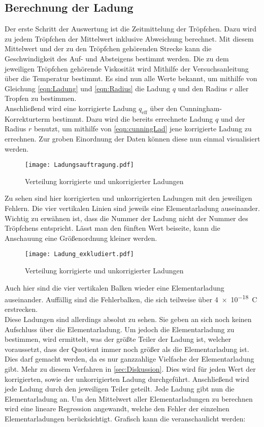 \subsection{Berechnung der Ladung}
Der erste Schritt der Auswertung ist die Zeitmittelung der Tröpfchen. Dazu wird zu jedem Tröpfchen der Mittelwert inklusive Abweichung berechnet. Mit diesem Mittelwert und der 
zu den Tröpfchen gehörenden Strecke kann die Geschwindigkeit des Auf- und Absteigens bestimmt werden.
Die zu dem jeweiligen Tröpfchen gehörende Viskosität wird Mithilfe der Versuchsanleitung über die Temperatur bestimmt. 
Es sind nun alle Werte bekannt, um mithilfe von Gleichung \eqref{eqn:Ladung} und \eqref{eqn:Radius} die Ladung $q$ und den Radius $r$ aller Tropfen zu 
bestimmen. \\
\noindent Anschließend wird eine korrigierte Ladung $q_\text{eff}$ über den Cunningham-Korrekturterm bestimmt. 
Dazu wird die bereits errechnete Ladung $q$ und der Radius $r$ benutzt, um mithilfe von \eqref{eqn:cunningLad} jene korrigierte Ladung zu errechnen.
Zur groben Einordnung der Daten können diese nun einmal visualisiert werden.

\begin{figure}
    \centering
    \texttt{[image: Ladungsauftragung.pdf]}
    \caption{Verteilung korrigierte und unkorrigierter Ladungen}
    \label{fig:Ladungsverteilung}
\end{figure}

\noindent Zu sehen sind hier korrigierten und unkorrigierten Ladungen mit den jeweiligen Fehlern. Die vier vertikalen Linien sind jeweils eine 
Elementarladung auseinander. Wichtig zu erwähnen ist, dass die Nummer der Ladung nicht der Nummer des Tröpfchens entspricht.
Lässt man den fünften Wert beiseite, kann die Anschauung eine Größenordnung kleiner werden. 

\begin{figure*}
    \centering
    \texttt{[image: Ladung\_exkludiert.pdf]}
    \caption{Verteilung korrigierte und unkorrigierter Ladungen}
\end{figure*}

\noindent Auch hier sind die vier vertikalen Balken wieder eine Elementarladung auseinander.
Auffällig sind die Fehlerbalken, die sich teilweise über \qty{4e-18}{\coulomb} erstrecken. \\
\noindent Diese Ladungen sind allerdings absolut zu sehen. Sie geben an sich noch keinen Aufschluss über die Elementarladung.
Um jedoch die Elementarladung zu bestimmen, wird ermittelt, was der größte Teiler der Ladung ist, welcher voraussetzt, dass der Quotient 
immer noch größer als die Elementarladung ist. Dies darf gemacht werden, da es nur ganzzahlige Vielfache der Elementarladung gibt. 
Mehr zu diesem Verfahren in \autoref{sec:Diskussion}. 
Dies wird für jeden Wert der korrigierten, sowie der unkorrigierten Ladung durchgeführt. 
Anschließend wird jede Ladung durch den jeweiligen Teiler geteilt. Jede Ladung gibt nun die Elementarladung an.
Um den Mittelwert aller Elementarladungen zu berechnen wird eine lineare Regression angewandt, welche den Fehler der einzelnen Elementarladungen 
berücksichtigt. Grafisch kann die veranschaulicht werden:

